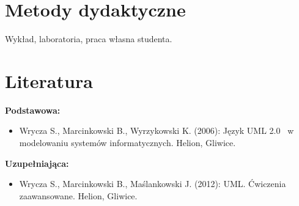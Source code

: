 \documentclass[12pt, a4paper]{article}
\begin{document}
\section{Metody dydaktyczne}

Wykład, laboratoria, praca własna studenta.

\section{Literatura}

\textbf{Podstawowa:}
\begin{itemize}
  \item Wrycza S., Marcinkowski B., Wyrzykowski K. (2006): Język UML 2.0  w modelowaniu systemów informatycznych. Helion, Gliwice.
\end{itemize}

\textbf{Uzupełniająca:}
\begin{itemize}
  \item Wrycza S., Marcinkowski B., Maślankowski J. (2012): UML. Ćwiczenia zaawansowane. Helion, Gliwice.
\end{itemize}
\end{document}

